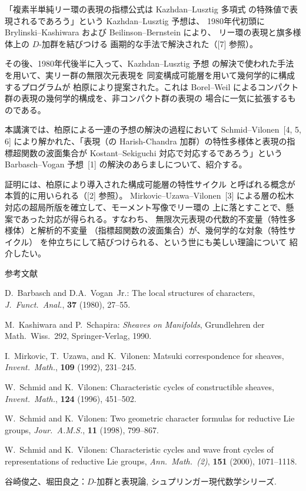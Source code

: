 \documentclass[uplatex,dvipdfmx]{jlreq}
\begin{document}
「複素半単純リー環の表現の指標公式は Kazhdan--Lusztig 多項式
の特殊値で表現されるであろう」という Kazhdan--Lusztig 予想は、
1980年代初頭に Brylinski--Kashiwara および Beilinson--Bernstein により、
リー環の表現と旗多様体上の $D$-加群を結びつける
画期的な手法で解決された（[7] 参照）。

その後、1980年代後半に入って、Kazhdan--Lusztig 予想
の解決で使われた手法を用いて、実リー群の無限次元表現を
同変構成可能層を用いて幾何学的に構成するプログラムが
柏原により提案された。これは Borel--Weil によるコンパクト
群の表現の幾何学的構成を、非コンパクト群の表現の
場合に一気に拡張するものである。

本講演では、柏原による一連の予想の解決の過程において
Schmid--Vilonen~[4, 5, 6] により解かれた、「表現（の
Harish-Chandra 加群）の特性多様体と表現の指標超関数の波面集合が
Kostant--Sekiguchi 対応で対応するであろう」という
Barbasch--Vogan 予想~[1] の解決のあらましについて、紹介する。

証明には、柏原により導入された構成可能層の特性サイクル
と呼ばれる概念が本質的に用いられる（[2] 参照）。
Mirkovic--Uzawa--Vilonen~[3]
による層の松木対応の超局所版を確立して、モーメント写像でリー環の
上に落とすことで、懸案であった対応が得られる。すなわち、
無限次元表現の代数的不変量（特性多様体）と解析的不変量
（指標超関数の波面集合）が、幾何学的な対象（特性サイクル）
を仲立ちにして結びつけられる、という世にも美しい理論について
紹介したい。

\begin{center}\textsc{参考文献}\end{center}
\begin{enumerate}[{[1]}]
  \item D.~Barbasch and D.A.~Vogan~Jr.:
    The local structures of characters,
    \textit{J.\ Funct.\ Anal.}, \textbf{37} (1980), 27--55.
  \item M.~Kashiwara and P.~Schapira:
    \textit{Sheaves on Manifolds},
    Grundlehren der Math.\ Wiss.\ 292, Springer-Verlag, 1990.
  \item I.~Mirkovic, T.~Uzawa, and K.~Vilonen:
    Matsuki correspondence for sheaves,
    \textit{Invent.\ Math.}, \textbf{109} (1992), 231--245.
  \item W.~Schmid and K.~Vilonen:
    Characteristic cycles of constructible sheaves,
    \textit{Invent.\ Math.}, \textbf{124} (1996), 451--502.
  \item W.~Schmid and K.~Vilonen:
    Two geometric character formulas for reductive Lie groups,
    \textit{Jour.\ A.M.S.}, \textbf{11} (1998), 799--867.
  \item W.~Schmid and K.~Vilonen:
    Characteristic cycles and wave front cycles of representations of reductive Lie groups,
    \textit{Ann.\ Math.\ (2)}, \textbf{151} (2000), 1071--1118.
  \item 谷崎俊之、堀田良之：$D$-加群と表現論, シュプリンガー現代数学シリーズ.
\end{enumerate}

\vfill
\end{document}

